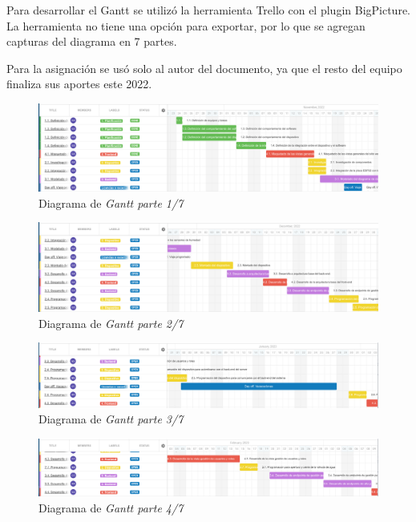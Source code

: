 \documentclass[
11pt, %
codirector, %
]{charter}
\begin{document}
Para desarrollar el Gantt se utilizó la herramienta Trello con el plugin BigPicture. La herramienta no tiene una opción para exportar, por lo que se agregan capturas del diagrama en 7 partes.

Para la asignación se usó solo al autor del documento, ya que el resto del equipo finaliza sus aportes este 2022.

\begin{figure}[htpb]
\centering 
\includegraphics[width=.999\textwidth]{./Figuras/Gantt-1.png}
\caption{Diagrama de \textit{Gantt parte 1/7}}
\label{fig:Gantt1}
\end{figure}

\begin{figure}[htpb]
\centering 
\includegraphics[width=.999\textwidth]{./Figuras/Gantt-2.png}
\caption{Diagrama de \textit{Gantt parte 2/7}}
\label{fig:Gantt2}
\end{figure}

\begin{figure}[htpb]
\centering 
\includegraphics[width=.999\textwidth]{./Figuras/Gantt-3.png}
\caption{Diagrama de \textit{Gantt parte 3/7}}
\label{fig:Gantt3}
\end{figure}

\begin{figure}[htpb]
\centering 
\includegraphics[width=.999\textwidth]{./Figuras/Gantt-4.png}
\caption{Diagrama de \textit{Gantt parte 4/7}}
\label{fig:Gantt4}
\end{figure}
\end{document}

